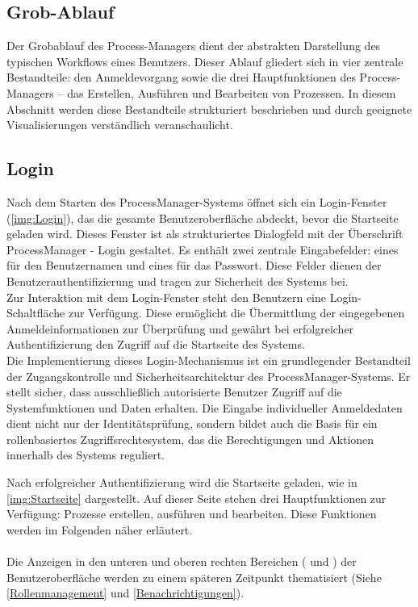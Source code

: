 \subsection{Grob-Ablauf}
Der Grobablauf des Process-Managers dient der abstrakten Darstellung des typischen Workflows eines Benutzers. Dieser Ablauf gliedert sich in vier zentrale Bestandteile: den Anmeldevorgang sowie die drei Hauptfunktionen des Process-Managers – das Erstellen, Ausführen und Bearbeiten von Prozessen. In diesem Abschnitt werden diese Bestandteile strukturiert beschrieben und durch geeignete Visualisierungen verständlich veranschaulicht.
\subsection*{Login}
Nach dem Starten des ProcessManager-Systems öffnet sich ein Login-Fenster (\autoref{img:Login}), das die gesamte Benutzeroberfläche abdeckt, bevor die Startseite geladen wird. Dieses Fenster ist als strukturiertes Dialogfeld mit der Überschrift \glqq ProcessManager - Login\grqq{} gestaltet. Es enthält zwei zentrale Eingabefelder: eines für den Benutzernamen und eines für das Passwort. Diese Felder dienen der Benutzerauthentifizierung und tragen zur Sicherheit des Systems bei.\\
Zur Interaktion mit dem Login-Fenster steht den Benutzern eine \glqq Login\grqq{}-Schaltfläche zur Verfügung. Diese ermöglicht die Übermittlung der eingegebenen Anmeldeinformationen zur Überprüfung und gewährt bei erfolgreicher Authentifizierung den Zugriff auf die Startseite des Systems. \\
Die Implementierung dieses Login-Mechanismus ist ein grundlegender Bestandteil der Zugangskontrolle und Sicherheitsarchitektur des ProcessManager-Systems. Er stellt sicher, dass ausschließlich autorisierte Benutzer Zugriff auf die Systemfunktionen und Daten erhalten. Die Eingabe individueller Anmeldedaten dient nicht nur der Identitätsprüfung, sondern bildet auch die Basis für ein rollenbasiertes Zugriffsrechtesystem, das die Berechtigungen und Aktionen innerhalb des Systems reguliert.


Nach erfolgreicher Authentifizierung wird die Startseite geladen, wie in \autoref{img:Startseite} dargestellt. Auf dieser Seite stehen drei Hauptfunktionen zur Verfügung: Prozesse erstellen, ausführen und bearbeiten. Diese Funktionen werden im Folgenden näher erläutert.\\
\\
Die Anzeigen in den unteren und oberen rechten Bereichen ( und ) der Benutzeroberfläche werden zu einem späteren Zeitpunkt thematisiert (Siehe \autoref{Rollenmanagement} und \autoref{Benachrichtigungen}).

